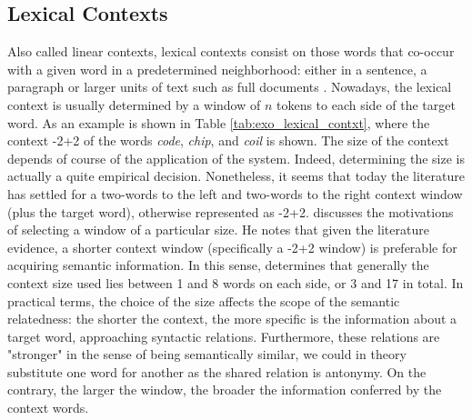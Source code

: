 

\subsection{Lexical Contexts}
Also called linear contexts, lexical contexts consist on those  words that co-occur with a given word in a predetermined neighborhood: either in a sentence, a paragraph or larger units of text such as full documents \cite{LevyG14,sahlgren2008distributional}. Nowadays, the lexical context is usually determined by a window of $n$ tokens to each side of the target word. As an example is shown in Table \ref{tab:exo_lexical_contxt}, where the context -2+2 of the words \textit{code}, \textit{chip}, and \textit{coil} is shown. The size of the context depends of course of the application of the system. Indeed, determining the size  is actually a quite empirical decision. Nonetheless, it seems that today the literature \cite{Daume2006,mikolov2013distributed,LevyG14,levy2014neural}  has settled for a two-words to the left and two-words to the right context window (plus the target word), otherwise represented as -2+2. \cite{sahlgren2006word} discusses  the motivations of selecting a window of a particular size. He notes that given the literature evidence,  a shorter context window (specifically a -2+2 window) is preferable for acquiring semantic information. In this sense, \cite{JurafskyM09} determines that generally the context size used lies between 1 and 8 words on each side, or 3 and 17 in total. In practical terms, the choice of the size  affects the scope of the semantic relatedness: the shorter the context, the more specific is the information about a target word, approaching syntactic relations. Furthermore, these relations are "stronger" in the sense of being semantically similar, we could in theory substitute one word for another as the shared relation is antonymy. On the contrary, the larger the window, the broader the information conferred by the context words. 



